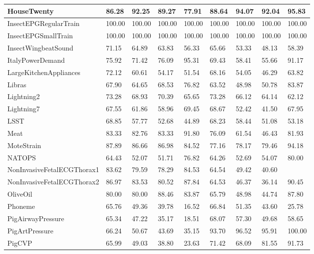 \begin{landscape}
\begin{longtable}{|l|llll|llll|}
    HouseTwenty & 86.28 & 92.25 & 89.27 & 77.91 & 88.64 & 94.07 & 92.04 & 95.83 \\ \hline
    InsectEPGRegularTrain & 100.00 & 100.00 & 100.00 & 100.00 & 100.00 & 100.00 & 100.00 & 100.00 \\ \hline
    InsectEPGSmallTrain & 100.00 & 100.00 & 100.00 & 100.00 & 100.00 & 100.00 & 100.00 & 100.00 \\ \hline
    InsectWingbeatSound & 71.15 & 64.89 & 63.83 & 56.33 & 65.66 & 53.33 & 48.13 & 58.39 \\ \hline
    ItalyPowerDemand & 75.92 & 71.42 & 76.09 & 95.31 & 69.43 & 58.41 & 55.66 & 91.17 \\ \hline
    LargeKitchenAppliances & 72.12 & 60.61 & 54.17 & 51.54 & 68.16 & 54.05 & 46.29 & 63.82 \\ \hline
    Libras & 67.90 & 64.65 & 68.53 & 76.82 & 63.52 & 48.98 & 50.78 & 83.87 \\ \hline
    Lightning2 & 73.28 & 68.93 & 70.39 & 65.65 & 73.28 & 66.12 & 64.14 & 62.12 \\ \hline
    Lightning7 & 67.55 & 61.86 & 58.96 & 69.45 & 68.67 & 52.42 & 41.50 & 67.95 \\ \hline
    LSST & 68.85 & 57.77 & 52.68 & 44.89 & 68.23 & 58.44 & 51.08 & 53.18 \\ \hline
    Meat & 83.33 & 82.76 & 83.33 & 91.80 & 76.09 & 61.54 & 46.43 & 81.93 \\ \hline
    MoteStrain & 87.89 & 86.66 & 86.98 & 84.52 & 77.16 & 78.17 & 79.46 & 94.18 \\ \hline
    NATOPS & 64.43 & 52.07 & 51.71 & 76.82 & 64.26 & 52.69 & 54.07 & 80.00 \\ \hline
    NonInvasiveFetalECGThorax1 & 83.62 & 79.59 & 78.29 & 84.53 & 64.54 & 49.42 & 40.60 &   \\ \hline
    NonInvasiveFetalECGThorax2 & 86.97 & 83.53 & 80.52 & 87.84 & 64.53 & 46.37 & 36.14 & 90.45 \\ \hline
    OliveOil & 80.00 & 80.00 & 88.46 & 83.87 & 65.79 & 48.98 & 44.74 & 87.80 \\ \hline
    Phoneme & 65.76 & 49.36 & 39.78 & 16.52 & 66.84 & 51.35 & 43.60 & 25.78 \\ \hline
    PigAirwayPressure & 65.34 & 47.22 & 35.17 & 18.51 & 68.07 & 57.30 & 49.68 & 58.65 \\ \hline
    PigArtPressure & 66.24 & 50.67 & 43.69 & 35.15 & 93.70 & 96.52 & 95.91 & 100.00 \\ \hline
    PigCVP & 65.99 & 49.03 & 38.80 & 23.63 & 71.42 & 68.09 & 81.55 & 91.73 \\ \hline

\end{longtable}
\end{landscape}
